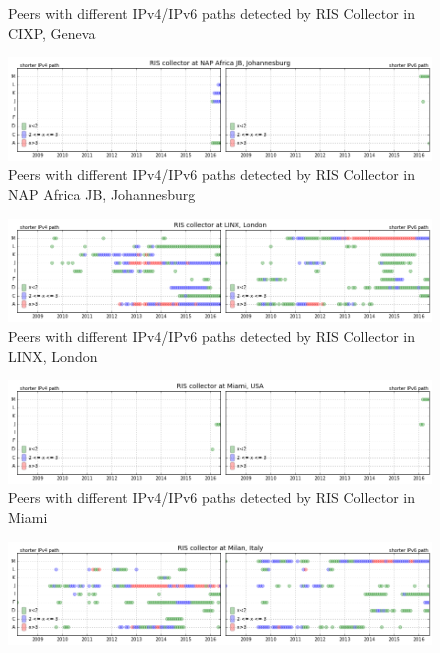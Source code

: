 \begin{appendices}
\begin{figure}[!htb]
		\caption{Peers with different IPv4/IPv6 paths detected by RIS Collector in CIXP, Geneva}
		\label{fig:coll-geneva}
	\end{figure}	
	\begin{figure}
		\centering
		\includegraphics[width=6.0in]{img/coll-johannesburg.png}
		\caption{Peers with different IPv4/IPv6 paths detected by RIS Collector in NAP Africa JB, Johannesburg}
		\label{fig:coll-johannesburg}
	\end{figure}	
	\begin{figure}[!htb]
		\centering
		\includegraphics[width=6.0in]{img/coll-london.png}
		\caption{Peers with different IPv4/IPv6 paths detected by RIS Collector in LINX, London}
		\label{fig:coll-london}
	\end{figure}
	\begin{figure}[!htb]
		\centering
		\includegraphics[width=6.0in]{img/coll-miami.png}
		\caption{Peers with different IPv4/IPv6 paths detected by RIS Collector in Miami}
		\label{fig:coll-miami}
	\end{figure}	
	\begin{figure}[!htb]
		\centering
		\includegraphics[width=6.0in]{img/coll-milan.png}

\end{figure}
\end{appendices}
